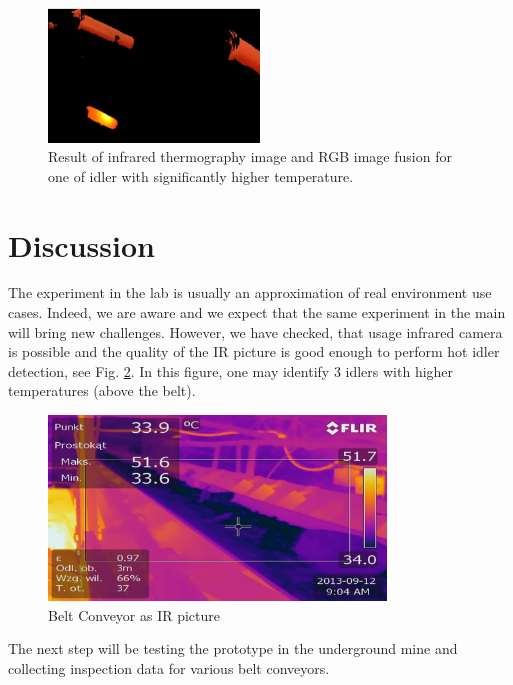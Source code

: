\documentclass[3p,times,12pt]{elsarticle}
\begin{document}
\begin{figure}[ht!]
	\centering
	\includegraphics[width=0.5\textwidth]{fusion2.png}
	\caption{Result of infrared thermography image and RGB image fusion for one of idler with significantly higher temperature.}
	\label{fig:fusion2}
\end{figure}

\section{Discussion}\label{disc}
The experiment in the lab is usually an approximation of real environment use cases. Indeed, we are aware and we expect that the same experiment in the main will bring new challenges. However, we have checked, that usage infrared camera is possible and the quality of the IR picture is good enough to perform hot idler detection, see Fig. \ref{fig:BC_termo}.
In this figure, one may identify 3 idlers with higher temperatures (above the belt).
\begin{figure}[ht!]
	\centering
	\includegraphics[width=0.8\textwidth]{BC_termo.png}
	\caption{Belt Conveyor as IR picture}
	\label{fig:BC_termo}
\end{figure}
The next step will be testing the prototype in the underground mine and collecting inspection data for various belt conveyors.
\end{document}
